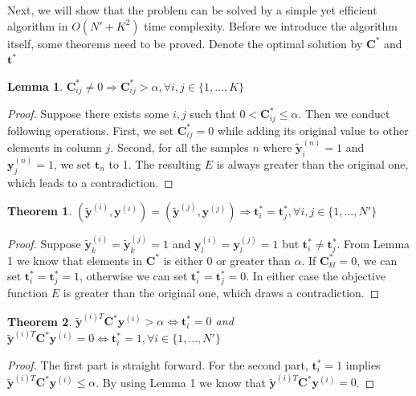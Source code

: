 \documentclass[10pt,twocolumn,letterpaper]{article}
\def\vec{\mathbf}
\def\mat{\mathbf}
\newtheorem{lemma}{Lemma}
\newtheorem{theorem}{Theorem}
\begin{document}
Next, we will show that the problem can be solved by a simple yet efficient algorithm in $O(N'+K^2)$ time complexity. Before we introduce the algorithm itself, some theorems need to be proved. Denote the optimal solution by $\mat{C}^*$ and $\vec{t}^*$
\begin{lemma}
$\mat{C}^*_{ij} \neq 0 \Rightarrow \mat{C}^*_{ij} > \alpha, \forall i,j \in \{1,\dots,K\}$
\end{lemma}
\begin{proof}
Suppose there exists some $i,j$ such that $0 < \mat{C}^*_{ij} \leq \alpha$. Then we conduct following operations. First, we set $\mat{C}^*_{ij}=0$ while adding its original value to other elements in column $j$. Second, for all the samples $n$ where $\tilde{\vec{y}}^{(n)}_i=1$ and $\vec{y}^{(n)}_j=1$, we set $\vec{t}_n$ to 1. The resulting $E$ is always greater than the original one, which leads to a contradiction.
\end{proof}
\begin{theorem}
$(\tilde{\vec{y}}^{(i)},\vec{y}^{(i)})=(\tilde{\vec{y}}^{(j)},\vec{y}^{(j)}) \Rightarrow \vec{t}^*_i=\vec{t}^*_j, \forall i,j \in \{1,\dots,N'\}$
\end{theorem}
\begin{proof}
Suppose $\tilde{\vec{y}}^{(i)}_k=\tilde{\vec{y}}^{(j)}_k=1$ and $\vec{y}^{(i)}_l=\vec{y}^{(j)}_l=1$ but $\vec{t}^*_i \neq \vec{t}^*_j$. From Lemma 1 we know that elements in $\mat{C}^*$ is either 0 or greater than $\alpha$. If $\mat{C}^*_{kl}=0$, we can set $\vec{t}^*_i=\vec{t}^*_j=1$, otherwise we can set $\vec{t}^*_i=\vec{t}^*_j=0$. In either case the objective function $E$ is greater than the original one, which draws a contradiction.
\end{proof}
\begin{theorem}
$\tilde{\vec{y}}^{(i)T} \mat{C}^* \vec{y}^{(i)} > \alpha \Leftrightarrow \vec{t}^*_i=0$ and $\tilde{\vec{y}}^{(i)T} \mat{C}^* \vec{y}^{(i)} = 0 \Leftrightarrow \vec{t}^*_i=1, \forall i \in \{1,\dots,N'\}$
\end{theorem}
\begin{proof}
The first part is straight forward. For the second part, $\vec{t}^*_i=1$ implies $\tilde{\vec{y}}^{(i)T} \mat{C}^* \vec{y}^{(i)} \leq \alpha$. By using Lemma 1 we know that $\tilde{\vec{y}}^{(i)T} \mat{C}^* \vec{y}^{(i)} = 0$.
\end{proof}
\end{document}
